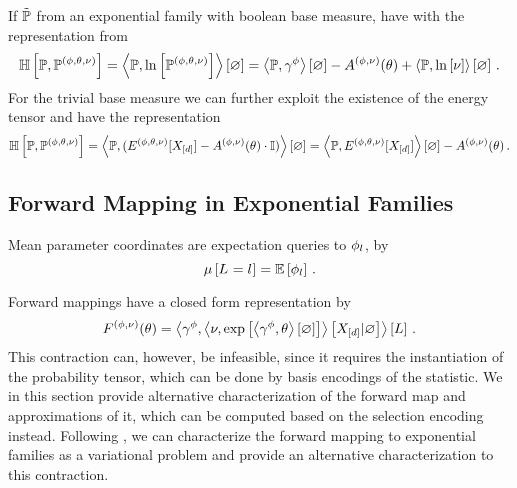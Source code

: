 \begin{example}\label{exa:cEntropyExp}
	If $\tilde{\mathbb{P}}$ from an exponential family with boolean base measure, have with the representation from 
	\begin{align*}
		\mathbb{H}\left[\mathbb{P},\mathbb{P}^{(\phi,\theta,\nu)}\right] 
		= \left\langle \mathbb{P},\ln \left[ \mathbb{P}^{(\phi,\theta,\nu)} \right]\right\rangle \left[ \varnothing \right] 
		= \left\langle \mathbb{P},\gamma^{\phi}\right\rangle \left[ \varnothing \right] - A^{(\phi,\nu)}(\theta) + \left\langle \mathbb{P},\ln \left[ \nu \right]\right\rangle \left[ \varnothing \right] \, . 
	\end{align*}
	For the trivial base measure we can further exploit the existence of the energy tensor and have the representation
		\[ \mathbb{H}\left[\mathbb{P},\mathbb{P}^{(\phi,\theta,\nu)}\right] = \left\langle \mathbb{P},(E^{(\phi,\theta,\nu)}[X_{[d]}]-A^{(\phi,\nu)}(\theta)\cdot \mathbb{I})\right\rangle \left[ \varnothing \right]
		=   \left\langle \mathbb{P},E^{(\phi,\theta,\nu)}[X_{[d]}]\right\rangle \left[ \varnothing \right] -A^{(\phi,\nu)}(\theta) \, .   \]
\end{example}




\subsection{Forward Mapping in Exponential Families} 




Mean parameter coordinates are expectation queries to $\phi_{l}$, by 
	\[ \mu\left[L_{}=l_{}\right] = \mathbb{E}\left[\phi_{l}\right] \, . \]
	
Forward mappings have a closed form representation by
	\[ F^{(\phi,\nu)}(\theta)
	= \left\langle \gamma^{\phi},\left\langle \nu,\mathrm{exp}\left[\left\langle \gamma^{\phi},\theta\right\rangle \left[ \varnothing \right]\right]\right\rangle \left[ X_{[d]} | \varnothing \right]\right\rangle \left[ L \right] \, . \]
This contraction can, however, be infeasible, since it requires the instantiation of the probability tensor, which can be done by basis encodings of the statistic.
We in this section provide alternative characterization of the forward map and approximations of it, which can be computed based on the selection encoding instead.
Following \cite{wainwright_graphical_2008}, we can characterize the forward mapping to exponential families as a variational problem and provide an alternative characterization to this contraction.



